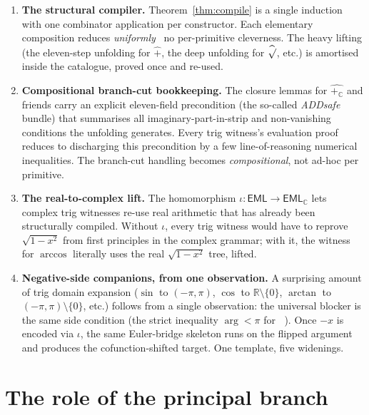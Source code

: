 \documentclass[11pt]{article}
\newcommand{\hsqrt}{\mathop{\widehat{\sqrt{\vphantom{x}}}}}
\newcommand{\hadd}{\mathbin{\widehat{+}}}
\newcommand{\hlogC}{\mathop{\widehat{\log_{\!\mathbb{C}}}}}
\newcommand{\haddC}{\mathbin{\widehat{+_{\!\mathbb{C}}}}}
\newcommand{\EML}{\mathsf{EML}}
\newcommand{\EMLC}{\mathsf{EML}_{\mathbb{C}}}
\theoremstyle{plain}
\theoremstyle{definition}
\begin{document}
\begin{enumerate}[topsep=2pt, itemsep=4pt]
\item \textbf{The structural compiler.} Theorem~\ref{thm:compile} is a
  single induction with one combinator application per constructor.
  Each elementary composition reduces \emph{uniformly} \textemdash\ no
  per-primitive cleverness. The heavy lifting (the eleven-step
  unfolding for $\hadd$, the deep unfolding for $\hsqrt$, etc.) is
  amortised inside the catalogue, proved once and re-used.

\item \textbf{Compositional branch-cut bookkeeping.} The closure
  lemmas for $\haddC$ and friends carry an explicit eleven-field
  precondition (the so-called \emph{ADDsafe} bundle) that summarises
  all imaginary-part-in-strip and non-vanishing conditions the
  unfolding generates. Every trig witness's evaluation proof reduces
  to discharging this precondition by a few line-of-reasoning
  numerical inequalities. The branch-cut handling becomes
  \emph{compositional}, not ad-hoc per primitive.

\item \textbf{The real-to-complex lift.} The homomorphism
  $\iota : \EML \to \EMLC$ lets complex trig witnesses re-use real
  arithmetic that has already been structurally compiled. Without
  $\iota$, every trig witness would have to reprove $\sqrt{1 - x^2}$
  from first principles in the complex grammar; with it, the witness
  for $\arccos$ literally uses the real $\sqrt{1 - x^2}$ tree, lifted.

\item \textbf{Negative-side companions, from one observation.}
  A surprising amount of trig domain expansion ($\sin$ to $(-\pi, \pi)$,
  $\cos$ to $\mathbb{R}\setminus\{0\}$, $\arctan$ to
  $(-\pi, \pi)\setminus\{0\}$, etc.) follows from a single observation:
  the universal blocker is the same side condition (the strict
  inequality $\arg < \pi$ for $\hlogC$). Once $-x$ is encoded via
  $\iota$, the same Euler-bridge skeleton runs on the flipped argument
  and produces the cofunction-shifted target. One template, five
  widenings.
\end{enumerate}

\section{The role of the principal branch}
\label{sec:branch}
\end{document}
